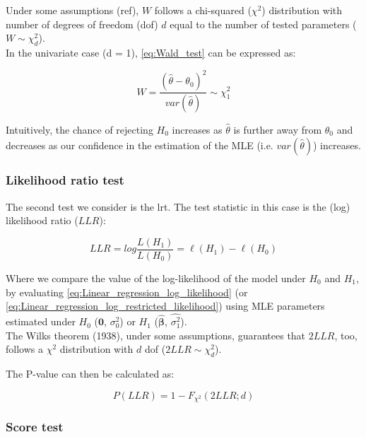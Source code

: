Under some assumptions (ref), $W$ follows a chi-squared ($\chi^2$) distribution with number of degrees of freedom (dof) $d$ equal to the number of tested parameters ($W \sim \chi^2_d $).\\

In the univariate case (d = 1), \eqref{eq:Wald_test} can be expressed as:

\begin{equation}\label{eq:Wald_test_univariate}
    W = \frac{(\hat{\theta}-\theta_0)^2}{var(\hat{\theta})} \sim \chi^2_1
\end{equation}

Intuitively, the chance of rejecting $H_0$ increases as $\hat{\theta}$ is further away from $\theta_0$
and decreases as our confidence in the estimation of the MLE (i.e. $var(\hat{\theta})$) increases.


\subsubsection{Likelihood ratio test}

The second test we consider is the \gls{lrt}.
The test statistic in this case is the (log) likelihood ratio ($LLR$):

\begin{equation}\label{eq:log_likelihood_ratio}
LLR = log \frac{L(H_1)}{L(H_0)} = \ell(H_1) - \ell(H_0) 
\end{equation}

Where we compare the value of the log-likelihood of the model under $H_0$ and $H_1$, by evaluating \eqref{eq:Linear_regression_log_likelihood} (or \eqref{eq:Linear_regression_log_restricted_likelihood}) using MLE parameters estimated under $H_0$ ($\mathbf{0}$, $\sigma_0^2$) or $H_1$ ($\hat{\boldsymbol{\beta}}$, $\hat{\sigma_1^2}$).  \\

The Wilks theorem (1938), under some assumptions, guarantees that $2LLR$, too, follows a $\chi^2$ distribution with $d$ dof ($2LLR \sim \chi^2_d$).

The P-value can then be calculated as:

\begin{equation}\label{eq:lrt_p_value}
    P(LLR) = 1-F_{\chi^2}(2LLR; d)
\end{equation}

\subsubsection{Score test}

